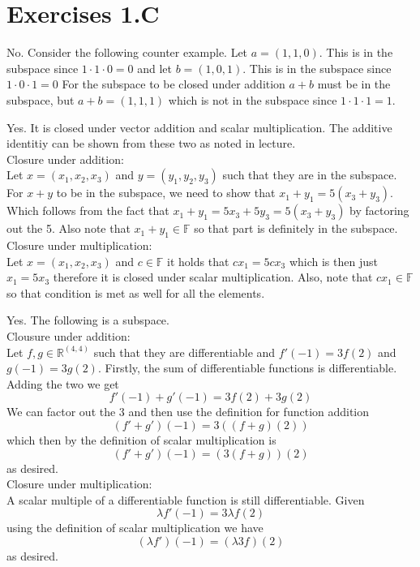 \documentclass[10pt, twocolumn]{article}
\newcommand{\R}{\mathbb{R}}
\begin{document}
\section*{Exercises 1.C}
\begin{q}[Problem 1(c)]
    No. Consider the following counter example. 
    Let $ a = (1, 1, 0) $. This is in the subspace since $ 1 \cdot 1 \cdot 0 = 0 $ 
    and let  $ b = (1, 0, 1) $. This is in the subspace since $ 1 \cdot 0 \cdot 1 = 0 $ 
    For the subspace to be closed under addition $ a + b $ must be in the subspace, 
    but $ a + b = (1, 1, 1) $ which is not in the subspace since $ 1 \cdot 1 \cdot 1 = 1 $.
\end{q}
\begin{q}[Problem 1(d)]
    Yes. It is closed under vector addition and scalar multiplication. The additive identitiy can be shown from these two as noted in lecture.\\
    Closure under addition: \\
    Let $ x = (x_1, x_2, x_3) $ and $ y = (y_1, y_2, y_3) $ such that they are in the subspace.
    For $ x + y $ to be in the subspace, we need to show that $ x_1 + y_1 = 5(x_3 + y_3) $. 
    Which follows from the fact that $ x_1 + y_1 = 5x_3 + 5y_3 = 5(x_3 + y_3) $  by factoring out the 5. 
    Also note that $ x_1 + y_1 \in \mathbb{F} $ so that part is definitely in the subspace.
    Closure under multiplication: \\
    Let $ x = (x_1, x_2, x_3) $ and $ c \in \mathbb{F} $ it holds that $ c x_1 = 5c x_3 $ which is then just $ x_1 = 5 x_3 $ 
    therefore it is closed under scalar multiplication. Also, note that $ cx_1 \in \mathbb{F} $ so that condition is met as well for all the elements.
\end{q}
\begin{q}[Problem 3]
    Yes. The following is a subspace. \\
    Clousure under addition: \\
    Let $ f, g \in \R^{(4, 4)} $ such that they are differentiable and $ f'(-1) = 3f(2) $ and $ g(-1) = 3g(2) $. 
    Firstly, the sum of differentiable functions is differentiable.
    Adding the two we get $$ f'(-1) + g'(-1) = 3f(2) + 3g(2) $$ 
    We can factor out the 3 and then use the definition for function addition 
    $$ (f'+ g')(-1) = 3((f+g)(2)) $$ which then by the definition of scalar multiplication is 
    $$ (f'+ g')(-1) = (3(f+g))(2) $$ as desired. \\
    Closure under multiplication: \\
    A scalar multiple of a differentiable function is still differentiable. 
    Given
    $$ \lambda f'(-1) = 3 \lambda f(2) $$
    using the definition of scalar multiplication we have
    $$ (\lambda f')(-1) = (\lambda 3 f)(2) $$
    as desired.
\end{q}
\end{document}
